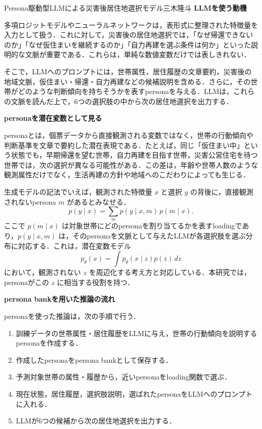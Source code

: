 \begin{column}{Persona駆動型LLMによる災害後居住地選択モデル}{三木隆斗}
\medskip
\noindent
\textbf{LLMを使う動機}

多項ロジットモデルやニューラルネットワークは，表形式に整理された特徴量を入力として扱う．これに対して，災害後の居住地選択では，「なぜ帰還できないのか」「なぜ仮住まいを継続するのか」「自力再建を選ぶ条件は何か」といった説明的な文脈が重要である．これらは，単純な数値変数だけでは表しきれない．

そこで，LLMへのプロンプトには，世帯属性，居住履歴の文章要約，災害後の地域文脈，仮住まい・帰還・自力再建などの候補説明を含める．さらに，その世帯がどのような判断傾向を持ちそうかを表すpersonaを与える．LLMは，これらの文脈を読んだ上で，6つの選択肢の中から次の居住地選択を出力する．

\medskip
\noindent
\textbf{personaを潜在変数として見る}

personaとは，個票データから直接観測される変数ではなく，世帯の行動傾向や判断基準を文章で要約した潜在表現である．たとえば，同じ「仮住まい中」という状態でも，早期帰還を望む世帯，自力再建を目指す世帯，災害公営住宅を待つ世帯では，次の選択が異なる可能性がある．この差は，年齢や世帯人数のような観測属性だけでなく，生活再建の方針や地域へのこだわりによっても生じる．

生成モデルの記法でいえば，観測された特徴量 \(x\) と選択 \(y\) の背後に，直接観測されないpersona \(m\) があるとみなせる．
\begin{equation}
p(y\mid x)
=
\sum_m p(y\mid x,m)\,p(m\mid x).
\end{equation}
ここで \(p(m\mid x)\) は対象世帯にどのpersonaを割り当てるかを表すloadingであり，\(p(y\mid x,m)\) は，そのpersonaを文脈として与えたLLMが各選択肢を選ぶ分布に対応する．これは，潜在変数モデル
\begin{equation}
p_\theta(x)=\int p_\theta(x\mid z)p(z)\,dz
\end{equation}
において，観測されない \(z\) を周辺化する考え方と対応している．本研究では，personaがこの \(z\) に相当する役割を持つ．

\medskip
\noindent
\textbf{persona bankを用いた推論の流れ}

personaを使った推論は，次の手順で行う．

\begin{enumerate}
\item 訓練データの世帯属性・居住履歴をLLMに与え，世帯の行動傾向を説明するpersonaを作成する．
\item 作成したpersonaをpersona bankとして保存する．
\item 予測対象世帯の属性・履歴から，近いpersonaをloading関数で選ぶ．
\item 現在状態，居住履歴，選択肢説明，選ばれたpersonaをLLMへのプロンプトに入れる．
\item LLMが6つの候補から次の居住地選択を出力する．
\end{enumerate}


\end{column}

